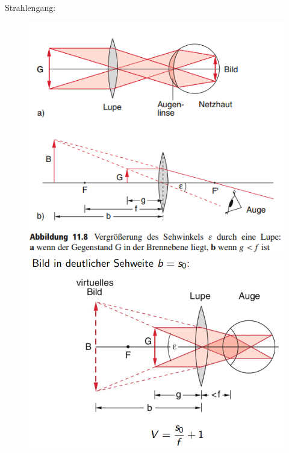 \documentclass[a4paper, 11pt, ngerman, parskip=half-]{scrartcl}
\begin{document}
Strahlengang:
\begin{figure}[H]
    \centering
    \begin{minipage}{0.5\linewidth}
        \centering
        \includegraphics[width=\linewidth]{image/20/3.png}
    \end{minipage}%
    \begin{minipage}{0.5\linewidth}
        \centering
        \includegraphics[width=\linewidth]{image/20/4.png}
    \end{minipage}
\end{figure}
\end{document}
